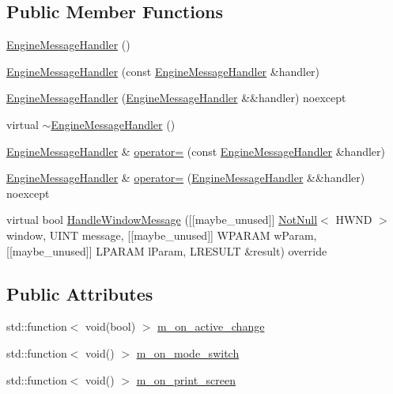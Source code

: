 \subsection*{Public Member Functions}
\begin{DoxyCompactItemize}
\item 
\hyperlink{classmage_1_1_engine_message_handler_a1d3e248f3b2b314e5a277a8397f08780}{Engine\+Message\+Handler} ()
\item 
\hyperlink{classmage_1_1_engine_message_handler_a02124b51211515e5bb93b0a1c3250a8c}{Engine\+Message\+Handler} (const \hyperlink{classmage_1_1_engine_message_handler}{Engine\+Message\+Handler} \&handler)
\item 
\hyperlink{classmage_1_1_engine_message_handler_ab771829274e6ab899b4499926f504667}{Engine\+Message\+Handler} (\hyperlink{classmage_1_1_engine_message_handler}{Engine\+Message\+Handler} \&\&handler) noexcept
\item 
virtual \hyperlink{classmage_1_1_engine_message_handler_a458f16ad9f68ad1e908e4d275c383c2c}{$\sim$\+Engine\+Message\+Handler} ()
\item 
\hyperlink{classmage_1_1_engine_message_handler}{Engine\+Message\+Handler} \& \hyperlink{classmage_1_1_engine_message_handler_a567c60f09df9fed3c725ab215e9afbe6}{operator=} (const \hyperlink{classmage_1_1_engine_message_handler}{Engine\+Message\+Handler} \&handler)
\item 
\hyperlink{classmage_1_1_engine_message_handler}{Engine\+Message\+Handler} \& \hyperlink{classmage_1_1_engine_message_handler_a77538e900f5c92e4da88de5042ca5f4c}{operator=} (\hyperlink{classmage_1_1_engine_message_handler}{Engine\+Message\+Handler} \&\&handler) noexcept
\item 
virtual bool \hyperlink{classmage_1_1_engine_message_handler_ab5dfd682d7ecc9d5d1c062d82143bca7}{Handle\+Window\+Message} (\mbox{[}\mbox{[}maybe\+\_\+unused\mbox{]}\mbox{]} \hyperlink{namespacemage_a8769f9d670d6b585ea306cb1062af94b}{Not\+Null}$<$ H\+W\+ND $>$ window, U\+I\+NT message, \mbox{[}\mbox{[}maybe\+\_\+unused\mbox{]}\mbox{]} W\+P\+A\+R\+AM w\+Param, \mbox{[}\mbox{[}maybe\+\_\+unused\mbox{]}\mbox{]} L\+P\+A\+R\+AM l\+Param, L\+R\+E\+S\+U\+LT \&result) override
\end{DoxyCompactItemize}
\subsection*{Public Attributes}
\begin{DoxyCompactItemize}
\item 
std\+::function$<$ void(bool) $>$ \hyperlink{classmage_1_1_engine_message_handler_a16317d998acb4511b1028b8e6e88027b}{m\+\_\+on\+\_\+active\+\_\+change}
\item 
std\+::function$<$ void() $>$ \hyperlink{classmage_1_1_engine_message_handler_ab1b4379bdda3e37fa2e71e482ae7904a}{m\+\_\+on\+\_\+mode\+\_\+switch}
\item 
std\+::function$<$ void() $>$ \hyperlink{classmage_1_1_engine_message_handler_adbe3af5dfc6ca46e7a41b8261ac82c3f}{m\+\_\+on\+\_\+print\+\_\+screen}
\end{DoxyCompactItemize}



